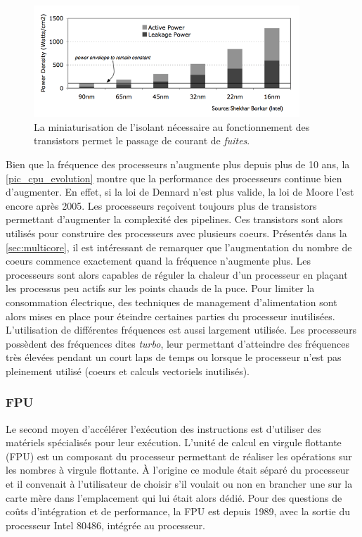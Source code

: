         \begin{figure}
            \center
            \includegraphics[width=10cm]{images/cpu_leakage.png}
            \caption{\label{pic_cpu_leakage} La miniaturisation de l'isolant nécessaire au fonctionnement des transistors permet le passage de courant de \textit{fuites}.}
        \end{figure}
        
        Bien que la fréquence des processeurs n'augmente plus depuis plus de 10 ans, la \autoref{pic_cpu_evolution} montre que la performance des processeurs continue bien d'augmenter. En effet, si la loi de Dennard n'est plus valide, la loi de Moore l'est encore après 2005. Les processeurs reçoivent toujours plus de transistors permettant d'augmenter la complexité des pipelines. Ces transistors sont alors utilisés pour construire des processeurs avec plusieurs coeurs. Présentés dans la \autoref{sec:multicore}, il est intéressant de remarquer que l'augmentation du nombre de coeurs commence exactement quand la fréquence n'augmente plus. Les processeurs sont alors capables de réguler la chaleur d'un processeur en plaçant les processus peu actifs sur les points chauds de la puce.
        Pour limiter la consommation électrique, des techniques de management d'alimentation sont alors mises en place pour éteindre certaines parties du processeur inutilisées.
        L'utilisation de différentes fréquences est aussi largement utilisée. Les processeurs possèdent des fréquences dites \textit{turbo}, leur permettant d'atteindre des fréquences très élevées pendant un court laps de temps ou lorsque le processeur n'est pas pleinement utilisé (coeurs et calculs vectoriels inutilisés).



    \subsubsection{FPU}\label{sec:fpu}
        
        Le second moyen d'accélérer l'exécution des instructions est d'utiliser des matériels spécialisés pour leur exécution. L'unité de calcul en virgule flottante (\gls{FPU}) est un composant du processeur permettant de réaliser les opérations sur les nombres à virgule flottante. À l'origine ce module était séparé du processeur et il convenait à l'utilisateur de choisir s'il voulait ou non en brancher une sur la carte mère dans l'emplacement qui lui était alors dédié. Pour des questions de coûts d'intégration et de performance, la FPU est depuis 1989, avec la sortie du processeur Intel 80486,  intégrée au processeur. 
        
